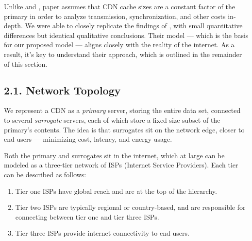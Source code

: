 \documentclass[
	a4paper, %
	10pt, %
	unnumberedsections, %
	twoside, %
]{LTJournalArticle}
\begin{document}
Unlike \cite{osmanthesis} and \cite{ulIslam2012}, paper \cite{biancoCDNs2017} assumes that CDN cache sizes are a constant factor of the primary in order to analyze transmission, synchronization, and other costs in-depth. We were able to closely replicate the findings of \cite{biancoCDNs2017}, with small quantitative differences but identical qualitative conclusions. Their model — which is the basis for our proposed model — aligns closely with the reality of the internet. As a result, it's key to understand their approach, which is outlined in the remainder of this section.

\subsection{2.1. Network Topology}

We represent a CDN as a \textit{primary} server, storing the entire data set, connected to several \textit{surrogate} servers, each of which store a fixed-size subset of the primary's contents. The idea is that surrogates sit on the network edge, closer to end users — minimizing cost, latency, and energy usage. 

Both the primary and surrogates sit in the internet, which at large can be modeled as a three-tier network of ISPs (Internet Service Providers). Each tier can be described as follows:
\begin{enumerate}
    \item Tier one ISPs have global reach and are at the top of the hierarchy.
    \item Tier two ISPs are typically regional or country-based, and are responsible for connecting between tier one and tier three ISPs.
    \item Tier three ISPs provide internet connectivity to end users.
\end{enumerate}




\end{document}
